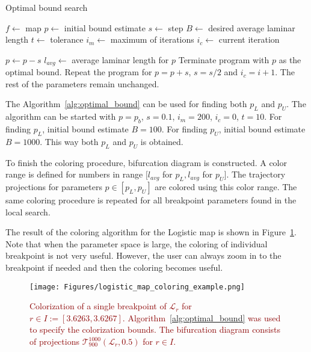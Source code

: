 \begin{algorithm}[!h]
    \caption{Optimal bound search}
    \label{alg:optimal_bound}
    \begin{algorithmic}[1]
        \Statex $f \gets$ map
        \Statex $p \gets$ initial bound estimate
        \Statex $s \gets$ step
        \Statex $B \gets$ desired average laminar length
        \Statex $t \gets$ tolerance
        \Statex $i_{m} \gets$ maximum of iterations
        \Statex $i_{c} \gets$ current iteration

            \State $p \gets p - s$
            \State $l_{avg} \gets$ average laminar length for $p$
                \State Terminate program with $p$ as the optimal bound.
            \EndIf
                \State Repeat the program for $p = p+s$, $s = s/2$ and $i_{c} = i+1$. The rest of the parameters remain unchanged.
            \EndIf
        \EndFor
    \end{algorithmic}
\end{algorithm}

The Algorithm~\ref{alg:optimal_bound} can be used for finding both $p_L$ and $p_U$.
The algorithm can be started with $p = p_b$, $s = 0.1$, $i_{m} = 200$, $i_{c} = 0$, $t = 10$.
For finding $p_L$, initial bound estimate $B = 100$.
For finding $p_U$, initial bound estimate $B = 1000$.
This way both $p_L$ and $p_U$ is obtained.
\par
To finish the coloring procedure, bifurcation diagram is constructed.
A color range is defined for numbers in range $[ l_{avg}$ for $p_L, l_{avg}$ for $p_U ]$.
The trajectory projections for parameters $p \in [ p_L, p_U ]$ are colored using this color range.
The same coloring procedure is repeated for all breakpoint parameters found in the local search.
\par
The result of the coloring algorithm for the Logistic map is shown in Figure~\ref{fig:coloring_example}.
Note that when the parameter space is large, the coloring of individual breakpoint is not very useful.
However, the user can always zoom in to the breakpoint if needed and then the coloring becomes useful.

\begin{figure}[!h]
    \centering
    \texttt{[image: Figures/logistic\_map\_coloring\_example.png]}
    \caption{
        \textcolor{darkred}{
        Colorization of a single breakpoint of $\mathcal{L}_{r}$ for $r \in I := [ 3.6263, 3.6267 ]$.
        Algorithm~\ref{alg:optimal_bound} was used to specify the colorization bounds.
        The bifurcation diagram consists of projections $\mathcal{T}_{900}^{1000}(\mathcal{L}_{r}, 0.5)$ for $r \in I$.
        }
    }
    \label{fig:coloring_example}
\end{figure}

